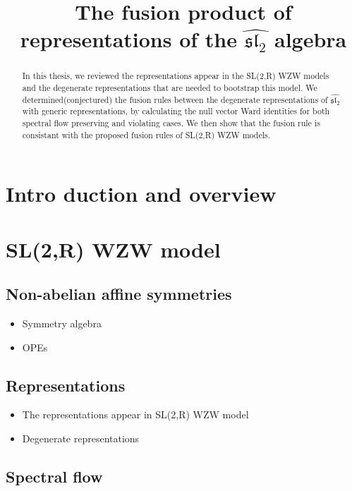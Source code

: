 \documentclass[10pt,a4paper]{article}
\numberwithin{equation}{section}
\begin{document}
\title{The fusion product of representations of the $\widehat{\mathfrak{sl}_{2}}$ algebra}
\maketitle


\begin{abstract}
    In this thesis, we reviewed the representations appear in the SL(2,R) WZW models and the degenerate representations that are needed 
    to bootstrap this model. We determined(conjectured) the fusion rules between the degenerate representations of $\widehat{\mathfrak{sl}_{2}}$ 
    with generic representations, by calculating the null vector Ward identities for both spectral flow preserving and violating cases. 
    We then show that the fusion rule is consistant with the proposed fusion rules of SL(2,R) WZW models.
\end{abstract}

\tableofcontents

\section{Intro duction and overview}

\section{SL(2,R) WZW model}

\subsection{Non-abelian affine symmetries}
\begin{itemize}
    \item Symmetry algebra
    \item OPEs
\end{itemize}

\subsection{Representations}
\begin{itemize}
    \item The representations appear in SL(2,R) WZW model
    \item Degenerate representations
\end{itemize}

\subsection{Spectral flow}
\end{document}

